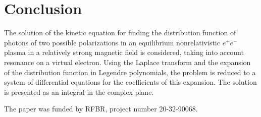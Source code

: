 \documentclass[
aps,%
12pt,%
final,%
notitlepage,%
oneside,%
onecolumn,%
nobibnotes,%
nofootinbib,%
superscriptaddress,%
noshowpacs,%
centertags]%
{revtex4}
\begin{document}
\section*{Conclusion}
The solution of the kinetic equation for finding the distribution function of photons of two possible polarizations in an equilibrium nonrelativistic $e^+e^-$ plasma in a relatively strong magnetic field is considered, taking into account resonance on a virtual electron.
Using the Laplace transform and the expansion of the distribution function in Legendre polynomials, the problem is reduced to a system of differential equations for the coefficients of this expansion. The solution is presented as an integral in the complex plane.

\begin{acknowledgments}
The paper was funded by RFBR, project number 20-32-90068.
\end{acknowledgments}
\end{document}
